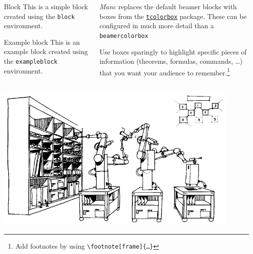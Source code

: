 \documentclass[compress,aspectratio=1610]{beamer}
\begin{document}
\begin{frame}[fragile]
  \begin{columns}
    \begin{column}{0.5\textwidth}
      \begin{block}{Block}
        This is a simple block created using the \texttt{block} environment.
      \end{block}
      \begin{exampleblock}{Example block}
        This is an example block created using the \texttt{exampleblock} environment.
      \end{exampleblock}
    \end{column}
    \begin{column}{0.5\textwidth}
      \emph{Manc} replaces the default beamer blocks with boxes from the \href{https://www.ctan.org/pkg/tcolorbox}{\texttt{tcolorbox}} package.
      These can be configured in much more detail than a \texttt{beamercolorbox}
      \medskip

      Use boxes sparingly to highlight specific pieces of information (theorems, formulas, commands, …) that you want your audience to remember.\footnote[frame]{Add footnotes by using \texttt{\backslash footnote[frame]\{…\}}}
    \end{column}
  \end{columns}
\end{frame}

\begin{frame}
  \centering
  \includegraphics[width=0.9\textwidth]{./graphics/self-replicating.png}
\end{frame}

\begin{darkframe}[c,noframenumbering]
\end{darkframe}

\end{document}
